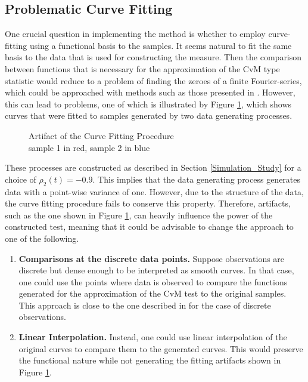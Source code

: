 \documentclass[12pt, a4paper]{article}
\theoremstyle{MAstyle} \newtheorem{assumption}{Assumption}[section]
\theoremstyle{MAstyle} \newtheorem{definition}{Definition}[section]
\theoremstyle{MAstyle} \newtheorem{theorem}{Theorem}[section]
\begin{document}
		\subsection{Problematic Curve Fitting}\label{problem_curve_fitting}
			One crucial question in implementing the method is whether to employ curve-fitting using a functional basis to the samples. It seems natural to fit the same basis to the data that is used for constructing the measure. Then the comparison between functions that is necessary for the approximation of the CvM type statistic would reduce to a problem of finding the zeroes of a finite Fourier-series, which could be approached with methods such as those presented in \cite{boyd_computing_2006}. 
			However, this can lead to problems, one of which is illustrated by Figure \ref{curve_fitting_artefacts}, which shows curves that were fitted to samples generated by two data generating processes.	
			\begin{figure}[H]
				\caption{Artifact of the Curve Fitting Procedure \\
				sample 1 in red, sample 2 in blue}
				\label{curve_fitting_artefacts}
			\end{figure}
			These processes are constructed as described in Section \ref{Simulation_Study} for a choice of $\rho_2(t) = -0.9$. This implies that the data generating process generates data with a point-wise variance of one. However, due to the structure of the data, the curve fitting procedure fails to conserve this property. Therefore, artifacts, such as the one shown in Figure \ref{curve_fitting_artefacts}, can heavily influence the power of the constructed test, meaning that it could be advisable to change the approach to one of the following.
			\begin{enumerate}
				\item \textbf{Comparisons at the discrete data points.} Suppose observations are discrete but dense enough to be interpreted as smooth curves. In that case, one could use the points where data is observed to compare the functions generated for the approximation of the CvM test to the original samples. This approach is close to the one described in \cite{bugni_permutation_2021} for the case of discrete observations.
				\item \textbf{Linear Interpolation.} Instead, one could use linear interpolation of the original curves to compare them to the generated curves. This would preserve the functional nature while not generating the fitting artifacts shown in Figure \ref{curve_fitting_artefacts}.
			\end{enumerate}
\end{document}
